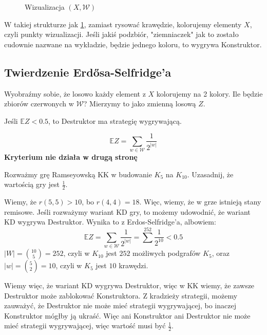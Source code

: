 \documentclass{../notatki}
\begin{document}
\begin{figure}[h!]
  \centering
  \caption{Wizualizacja $(X, \mathcal{W})$ \label{fig:xw}}
\end{figure}
W takiej strukturze jak \cref{fig:xw}, zamiast rysować krawędzie,
kolorujemy elementy $X$, czyli punkty wizualizacji. Jeśli jakiś podzbiór,
"ziemniaczek" jak to zostało cudownie nazwane na wykładzie, będzie jednego
koloru, to wygrywa Konstruktor.

\subsection{Twierdzenie Erd\H{o}sa-Selfridge'a}

Wyobraźmy sobie, że losowo każdy element z $X$ kolorujemy na 2 kolory.
Ile będzie zbiorów czerwonych w $\mathcal{W}$? Mierzymy to jako zmienną losową
$Z$.

Jeśli $\mathbb{E}Z < 0.5$, to Destruktor ma strategię wygrywającą.

$$
\mathbb{E}Z = \sum_{w \in \mathcal{W}} \frac{1}{2^{|w|}}
$$
\textbf{Kryterium nie działa w drugą stronę}

\begin{examplebox}
  Rozważmy grę Ramseyowską KK w budowanie $K_5$ na $K_{10}$. Uzasadnij,
  że wartością gry jest $\frac{1}{2}$.

  \vspace{1em}
  Wiemy, że $r(5, 5) > 10$, bo $r(4, 4) = 18$. Więc, wiemy, że w grze
  istnieją stany remisowe. Jeśli rozważymy wariant KD gry, to możemy udowodnić,
  że wariant KD wygrywa Destruktor. Wynika to z Erdos-Selfridge'a, albowiem:
  $$
  \mathbb{E}Z = \sum_{w \in \mathcal{W}} \frac{1}{2^{|w|}} =
  \sum^{252} \frac{1}{2^{10}} < 0.5
  $$
  $|W| = \binom{10}{5} = 252$, czyli w $K_{10}$ jest $252$ możliwych
  podgrafów $K_5$, oraz $|w| = \binom{5}{2} = 10$, czyli w $K_5$ jest
  $10$ krawędzi.

  Wiemy więc, że wariant KD wygrywa Destruktor, więc w KK wiemy, że
  zawsze Destruktor może zablokować Konstruktora. Z kradzieży strategii, możemy
  zauważyć, że Destruktor nie może mieć strategii wygrywającej, bo inaczej
  Konstruktor mógłby ją ukraść. Więc ani Konstruktor ani Destruktor nie może
  mieć strategii wygrywającej, więc wartość musi być $\frac{1}{2}$.
\end{examplebox}
\end{document}

